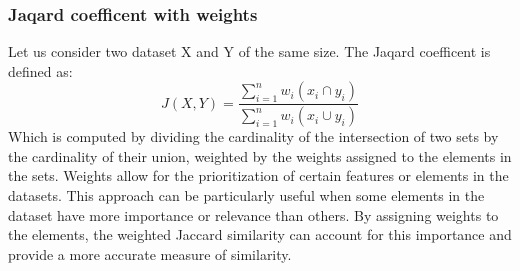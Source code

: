 \subsubsection{Jaqard coefficent with weights} Let us consider two dataset X and Y of the same size.
The Jaqard coefficent is defined as:\[J(X,Y) = \frac{\sum_{i=1}^{n}w_i(x_i \cap y_i)}{\sum_{i=1}^{n}w_i(x_i \cup y_i)}\]
Which is computed by dividing the cardinality of the intersection of two sets by the cardinality of their union, weighted by the weights assigned to the elements in the sets.
Weights allow for the prioritization of certain features or elements in the datasets.
This approach can be particularly useful when some elements in the dataset have more importance or relevance than others.
By assigning weights to the elements, the weighted Jaccard similarity can account for this importance and provide a more accurate measure of similarity.






